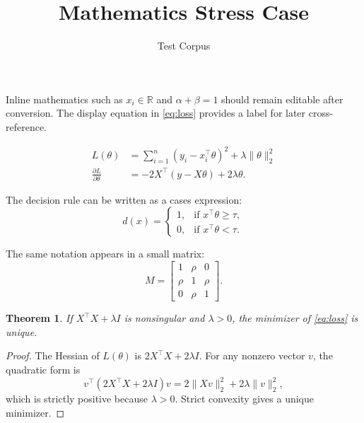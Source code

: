 \documentclass[11pt]{article}
\title{Mathematics Stress Case}
\author{Test Corpus}
\date{}
\newtheorem{theorem}{Theorem}
\begin{document}
\maketitle

Inline mathematics such as $x_i \in \mathbb{R}$ and $\alpha+\beta=1$ should
remain editable after conversion. The display equation in \eqref{eq:loss}
provides a label for later cross-reference.

\begin{align}
L(\theta)
  &= \sum_{i=1}^{n} \left(y_i - x_i^{\top}\theta\right)^2
     + \lambda \lVert \theta \rVert_2^2 \label{eq:loss}\\
\frac{\partial L}{\partial \theta}
  &= -2X^{\top}(y-X\theta)+2\lambda\theta.
\end{align}

The decision rule can be written as a cases expression:
\[
d(x)=
\begin{cases}
1, & \text{if } x^{\top}\theta \geq \tau,\\
0, & \text{if } x^{\top}\theta < \tau.
\end{cases}
\]

The same notation appears in a small matrix:
\[
M =
\begin{bmatrix}
1 & \rho & 0\\
\rho & 1 & \rho\\
0 & \rho & 1
\end{bmatrix}.
\]

\begin{theorem}
\label{thm:ridge}
If $X^{\top}X+\lambda I$ is nonsingular and $\lambda>0$, the minimizer of
\eqref{eq:loss} is unique.
\end{theorem}

\begin{proof}
The Hessian of $L(\theta)$ is $2X^{\top}X+2\lambda I$. For any nonzero vector
$v$, the quadratic form is
\[
v^{\top}(2X^{\top}X+2\lambda I)v = 2\lVert Xv\rVert_2^2+2\lambda\lVert v\rVert_2^2,
\]
which is strictly positive because $\lambda>0$. Strict convexity gives a unique
minimizer.
\end{proof}
\end{document}
